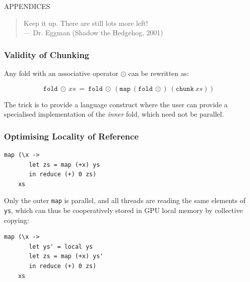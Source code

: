 \documentclass[rgb,dvipsnames]{beamer}
\begin{document}
\usebackgroundtemplate{}

\begin{frame}
  \begin{center}
    \huge{APPENDICES}
  \end{center}

  \vfill

  \begin{quote}
    Keep it up. There are still lots more left! \\\hfill ---
    Dr. Eggman (Shadow the Hedgehog, 2001)
  \end{quote}
\end{frame}

\begin{frame}
  \frametitle{Validity of Chunking}

  Any fold with an associative operator $\odot$ can be rewritten as:

  \[
   \texttt{fold}\ \odot\ xs\ =\ \texttt{fold}\ \odot\ (\texttt{map}\ (\texttt{fold}\ \odot)\ (\texttt{chunk}\ xs))
 \]

 The trick is to provide a language construct where the user can
 provide a specialised implementation of the \textit{inner} fold,
 which need not be parallel.
\end{frame}

\begin{frame}[fragile]
  \frametitle{Optimising Locality of Reference}

\begin{lstlisting}
map (\x ->
       let zs = map (+x) ys
       in reduce (+) 0 zs)
    xs
\end{lstlisting}

  Only the outer \lstinline{map} is parallel, and all threads are
  reading the same elements of \lstinline{ys}, which can thus be
  cooperatively stored in GPU local memory by collective copying:

\begin{lstlisting}
map (\x ->
       let ys' = local ys
       let zs = map (+x) ys'
       in reduce (+) 0 zs)
    xs
\end{lstlisting}

\end{frame}
\end{document}
